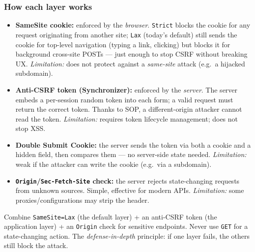 \documentclass[11pt,a4paper]{article}
\begin{document}
\subsubsection{How each layer works}
\begin{itemize}
  \item \textbf{SameSite cookie:} enforced by the \emph{browser}. \texttt{Strict} blocks the cookie for any request originating from another site; \texttt{Lax} (today's default) still sends the cookie for top-level navigation (typing a link, clicking) but blocks it for background cross-site POSTs — just enough to stop CSRF without breaking UX. \emph{Limitation:} does not protect against a \emph{same-site} attack (e.g.\ a hijacked subdomain).
  \item \textbf{Anti-CSRF token (Synchronizer):} enforced by the \emph{server}. The server embeds a per-session random token into each form; a valid request must return the correct token. Thanks to SOP, a different-origin attacker cannot read the token. \emph{Limitation:} requires token lifecycle management; does not stop XSS.
  \item \textbf{Double Submit Cookie:} the server sends the token via both a cookie and a hidden field, then compares them — no server-side state needed. \emph{Limitation:} weak if the attacker can write the cookie (e.g.\ via a subdomain).
  \item \textbf{\texttt{Origin}/\texttt{Sec-Fetch-Site} check:} the server rejects state-changing requests from unknown sources. Simple, effective for modern APIs. \emph{Limitation:} some proxies/configurations may strip the header.
\end{itemize}

\begin{infobox}
Combine \texttt{SameSite=Lax} (the default layer) + an anti-CSRF token (the application layer) + an \texttt{Origin} check for sensitive endpoints. Never use \texttt{GET} for a state-changing action. The \emph{defense-in-depth} principle: if one layer fails, the others still block the attack.
\end{infobox}

\end{document}
